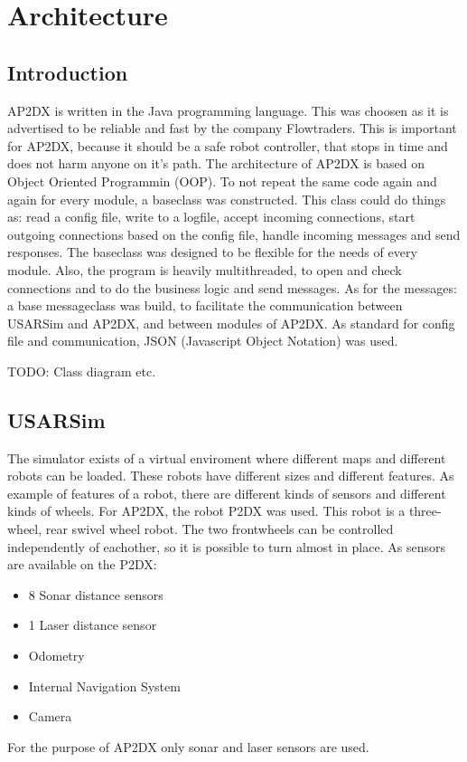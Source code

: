 \documentclass[a4paper,10pt]{article}
\begin{document}
\newpage

\section{Architecture}
\subsection{Introduction}
AP2DX is written in the Java programming language. This was choosen as it is advertised to be reliable and fast by the company Flowtraders. This is important for AP2DX, because it should be a safe robot controller, that stops in time and does not harm anyone on it's path. The architecture of AP2DX is based on Object Oriented Programmin (OOP). To not repeat the same code again and again for every module, a baseclass was constructed. This class could do things as: read a config file, write to a logfile, accept incoming connections, start outgoing connections based on the config file, handle incoming messages and send responses. The baseclass was designed to be flexible for the needs of every module. Also, the program is heavily multithreaded, to open and check connections and to do the business logic and send messages. As for the messages: a base messageclass was build, to facilitate the communication between USARSim and AP2DX, and between modules of AP2DX. As standard for config file and communication, JSON (Javascript Object Notation) was used.

TODO: Class diagram etc.

\subsection{USARSim}
The simulator exists of a virtual enviroment where different maps and different robots can be loaded. These robots have different sizes and different features. As example of features of a robot, there are different kinds of sensors and different kinds of wheels. For AP2DX, the robot P2DX was used. This robot is a three-wheel, rear swivel wheel robot. The two frontwheels can be controlled independently of eachother, so it is possible to turn almost in place. As sensors are available on the P2DX:
\begin{itemize}
\item 8 Sonar distance sensors
\item 1 Laser distance sensor
\item Odometry
\item Internal Navigation System
\item Camera
\end{itemize}
For the purpose of AP2DX only sonar and laser sensors are used.
\end{document}
